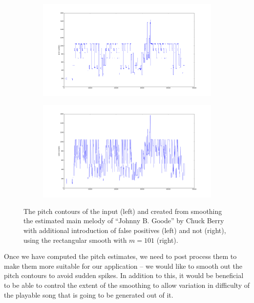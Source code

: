 \begin{figure}[t]     
        \centering
        \begin{subfigure}[b]{0.48\textwidth}
                \includegraphics[width=\textwidth]{Figures/input_simple}
                \vspace{20pt}
        \end{subfigure}
        \begin{subfigure}[b]{0.48\textwidth}
                \includegraphics[width=\textwidth]{Figures/rect_101}
                \vspace{20pt}
        \end{subfigure}
    \caption{The pitch contours of the input (left) and created from smoothing the estimated main melody of ``Johnny B. Goode'' by Chuck Berry with additional introduction of false positives (left) and not (right), using the rectangular smooth with $m=101$ (right).}
	\label{fig:rectangular}
\end{figure}

Once we have computed the pitch estimates, we need to post process them to make them more suitable for our application -- we would like to smooth out the pitch contours to avoid sudden spikes. In addition to this, it would be beneficial to be able to control the extent of the smoothing to allow variation in difficulty of the playable song that is going to be generated out of it. 

